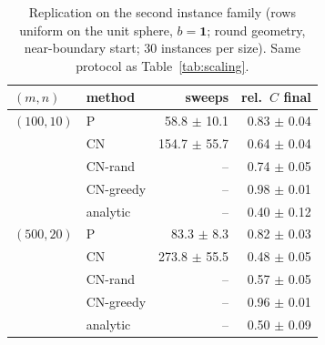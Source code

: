 \begin{table}[t]\centering
\caption{Replication on the second instance family (rows uniform on the unit sphere, $b=\mathbf{1}$; round geometry, near-boundary start; 30 instances per size). Same protocol as Table~\ref{tab:scaling}.}
\label{tab:sphere}
\small
\begin{tabular}{llrr}
\toprule
$(m,n)$ & method & sweeps & rel.\ $C$ final \\
\midrule
$(100,10)$ & P & 58.8 $\pm$ 10.1 & 0.83 $\pm$ 0.04 \\
 & CN & 154.7 $\pm$ 55.7 & 0.64 $\pm$ 0.04 \\
 & CN-rand & -- & 0.74 $\pm$ 0.05 \\
 & CN-greedy & -- & 0.98 $\pm$ 0.01 \\
 & analytic & -- & 0.40 $\pm$ 0.12 \\
\midrule
$(500,20)$ & P & 83.3 $\pm$ 8.3 & 0.82 $\pm$ 0.03 \\
 & CN & 273.8 $\pm$ 55.5 & 0.48 $\pm$ 0.05 \\
 & CN-rand & -- & 0.57 $\pm$ 0.05 \\
 & CN-greedy & -- & 0.96 $\pm$ 0.01 \\
 & analytic & -- & 0.50 $\pm$ 0.09 \\
\bottomrule
\end{tabular}
\end{table}
